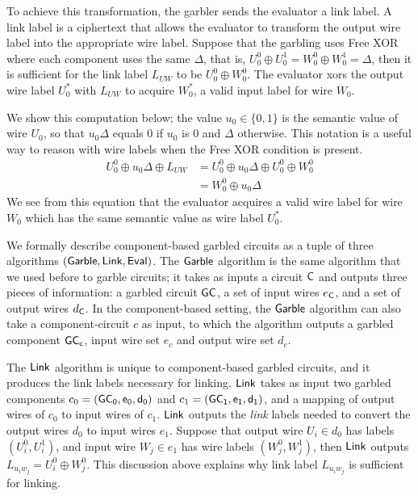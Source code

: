 

To achieve this transformation, the garbler sends the evaluator a link label.
A link label is a ciphertext that allows the evaluator to transform the output wire label into the appropriate wire label. 
Suppose that the garbling uses Free XOR where each component uses the same $\Delta$, that is, $U_0^0 \oplus U_0^1 = W_0^0 \oplus W_0^1 = \Delta$, then it is sufficient for the link label $L_{UW}$ to be $U_0^0 \oplus W_0^0$.
The evaluator xors the output wire label $U_0^*$ with $L_{UW}$ to acquire $W_0^*$, a valid input label for wire $W_0$. 

We show this computation below; the value $u_0 \in \{0,1\}$ is the semantic value of wire $U_0$, so that $u_0\Delta$ equals $0$ if $u_0$ is $0$ and $\Delta$ otherwise. 
This notation is a useful way to reason with wire labels when the Free XOR condition is present. 
\begin{align}
	U_0^0 \oplus u_0 \Delta \oplus L_{UW} & = U_0^0 \oplus u_0 \Delta \oplus U_0^0 \oplus W_0^0 \\
	& = W_0^0 \oplus u_0 \Delta
\end{align}
We see from this equation that the evaluator acquires a valid wire label for wire $W_0$ which has the same semantic value as wire label $U_0^*$.


We formally describe component-based garbled circuits as a tuple of three algorithms $(\sf{Garble}, \sf{Link}, \sf{Eval})$.
The $\sf{Garble}$ algorithm is the same algorithm that we used before to garble circuits; it takes as inputs a circuit $\sf {C}$ and outputs three pieces of information: a garbled circuit $\sf {GC}$, a set of input wires $e_{\sf {C}}$, and a set of output wires $d_{\sf {C}}$.
In the component-based setting, the $\sf{Garble}$ algorithm can also take a component-circuit $c$ as input, to which the algorithm outputs a garbled component $\sf {GC}_c$, input wire set $e_c$ and output wire set $d_c$. 

The $\sf{Link}$ algorithm is unique to component-based garbled circuits, and it produces the link labels necessary for linking.
$\sf{Link}$ takes as input two garbled components $c_0 = (\sf {GC}_0, e_0, d_0)$ and $c_1 = (\sf {GC}_1, e_1, d_1)$, and a mapping of output wires of $c_0$ to input wires of $c_1$. 
$\sf{Link}$ outputs the \textit{link} labels needed to convert the output wires $d_0$ to input wires $e_1$. 
Suppose that output wire $U_i \in d_0$ has labels $(U_i^0, U_i^1)$, and input wire $W_j \in e_1$ has wire labels $(W_j^0, W_j^1)$, then $\sf{Link}$ outputs $L_{u_i w_j} = U_i^0 \oplus W_j^0$. 
This discussion above explains why link label $L_{u_i w_j}$ is sufficient for linking. 

